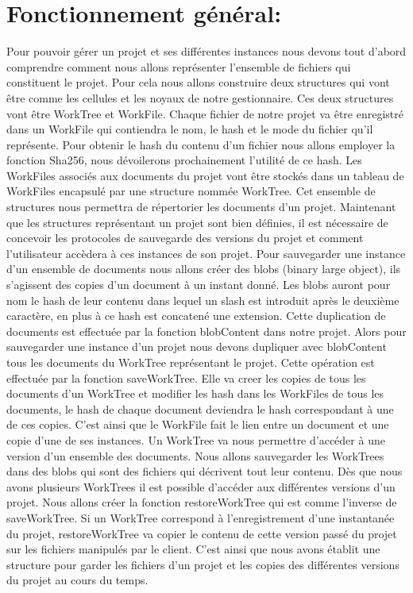 \documentclass[12pt,francais]{article}
\begin{document}
\section{Fonctionnement général:}
	Pour pouvoir gérer un projet et ses différentes instances nous devons tout d’abord comprendre comment nous allons représenter l’ensemble de fichiers qui constituent le projet. Pour cela nous allons construire deux structures qui vont être comme les cellules et les noyaux de notre gestionnaire. Ces deux structures vont être WorkTree et WorkFile. 
	Chaque fichier de notre projet va être enregistré dans un WorkFile qui contiendra le nom, le hash et le mode du fichier qu’il représente. Pour obtenir le hash du contenu d’un fichier nous allons employer la fonction Sha256, nous dévoilerons prochainement l’utilité de ce hash. Les WorkFiles associés aux documents du projet vont être stockés dans un tableau de WorkFiles encapsulé par une structure nommée WorkTree. Cet ensemble de structures nous permettra de répertorier les documents d’un projet.
	 Maintenant que les structures représentant un projet sont bien définies, il est nécessaire de concevoir les protocoles de sauvegarde des versions du projet et comment l’utilisateur accèdera à ces instances de son projet.
	Pour sauvegarder une instance d’un ensemble de documents nous allons créer des blobs (binary large object), ils s’agissent des copies d’un document à un instant donné. Les blobs auront pour nom le hash de leur contenu dans lequel un slash est introduit après le deuxième caractère, en plus à ce hash est concatené une extension. Cette duplication de documents est effectuée par la fonction blobContent dans notre projet. 
	Alors pour sauvegarder une instance d’un projet nous devons  dupliquer avec blobContent tous les documents du WorkTree  représentant le projet. Cette opération est effectuée par la fonction saveWorkTree. Elle va creer les copies de tous les documents d’un WorkTree et modifier les hash dans les WorkFiles de tous les documents, le hash de chaque document deviendra le hash correspondant à une de ces copies. C’est ainsi que le WorkFile fait le lien entre un document et une copie d’une de ses instances. Un WorkTree va nous permettre d’accéder à une version d’un ensemble des documents. Nous allons sauvegarder les WorkTrees dans des blobs qui sont des fichiers qui décrivent tout leur contenu. 
	Dès que nous avons plusieurs WorkTrees il est possible d’accéder aux différentes versions d’un projet.  Nous allons créer la fonction restoreWorkTree qui  est comme l’inverse de saveWorkTree. Si un WorkTree correspond à l’enregistrement d’une instantanée du projet,  restoreWorkTree va copier le contenu de cette version passé du projet sur les fichiers manipulés par le client. C’est ainsi que nous avons établit une structure pour garder les fichiers d’un projet et les copies des différentes versions du projet au cours du temps. \newline \newline
\end{document}
